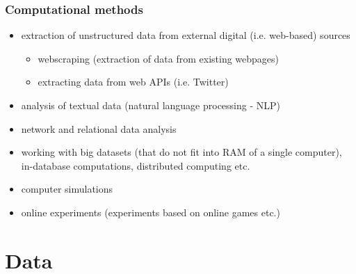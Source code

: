 \documentclass{beamer}
\begin{document}
\begin{frame}
    \frametitle{Computational methods}
    \begin{itemize}
        \item<1> extraction of unstructured data from external digital (i.e. web-based) sources
        \begin{itemize}
            \item<1> webscraping (extraction of data from existing webpages)
            \item<1> extracting data from web APIs (i.e. Twitter)
        \end{itemize}
        \item<1> analysis of textual data (natural language processing - NLP)
        \item<0> network and relational data analysis
        \item<0> working with big datasets (that do not fit into RAM of a single computer), in-database computations, distributed computing etc.
        \item<0> computer simulations
        \item<0> online experiments (experiments based on online games etc.)
    \end{itemize}
\end{frame}

\section[Data]{Data}
\end{document}
